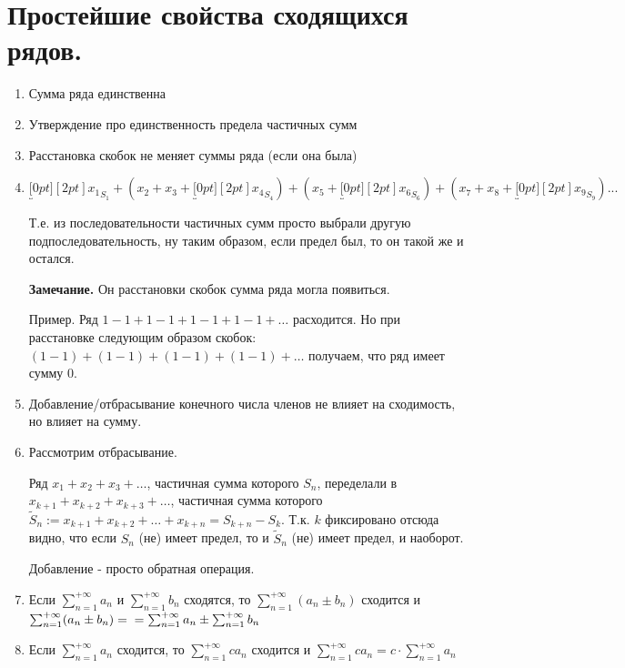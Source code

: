 \documentclass[12pt,letterpaper]{report}
\makeatletter
\theoremstyle{definition}
\renewenvironment{proof}[1][\proofname]{%
   \par\pushQED{\qed}\normalfont%
   \topsep6\p@\@plus6\p@\relax
   \trivlist\item[\hskip\labelsep\bfseries#1\@addpunct{.}]%
   \ignorespaces
}{%
   \popQED\endtrivlist\@endpefalse
}
\makeatother
\begin{document}
\section{Простейшие свойства сходящихся рядов.}

\begin{enumerate}
    \item Сумма ряда единственна
    
    \begin{proof}
        Утверждение про единственность предела частичных сумм
    \end{proof}

    \item Расстановка скобок не меняет суммы ряда (если она была)
    
    \begin{proof}
        $\underbracket[0pt][2pt]{x_1}_{S_1} + (x_2 + x_3 +
        \underbracket[0pt][2pt]{x_4}_{S_4}) + (x_5 + 
        \underbracket[0pt][2pt]{x_6}_{S_6}) + (x_7 + x_8 + 
        \underbracket[0pt][2pt]{x_9}_{S_9})...$

        Т.е. из последовательности частичных сумм просто выбрали
        другую подпоследовательность, ну таким образом, если предел был,
        то он такой же и остался.
    \end{proof}

    \textbf{Замечание.} Он расстановки скобок сумма ряда могла
    появиться.

    Пример. Ряд $1 - 1 + 1 - 1 + 1 - 1 + 1 - 1 + \dots$ расходится.
    Но при расстановке следующим образом скобок:
    $(1 - 1) + (1 - 1) + (1 - 1) + (1 - 1) + \dots$ получаем, что ряд
    имеет сумму $0$.

    \item Добавление/отбрасывание конечного числа членов не влияет на
    сходимость, но влияет на сумму.

    \begin{proof}
        Рассмотрим отбрасывание.

        Ряд $x_1 + x_2 + x_3 + \dots$, частичная сумма которого
        $S_n$, переделали в $x_{k+1} + x_{k+2} + x_{k+3} + \dots$,
        частичная сумма которого $\widetilde{S}_n := x_{k+1} + x_{k+2}
        + \dots + x_{k+n} = S_{k + n} - S_{k}$. Т.к. $k$ фиксировано
        отсюда видно, что если $S_n$ (не) имеет предел, то и
        $\widetilde{S}_n$ (не) имеет предел, и наоборот.

        Добавление - просто обратная операция.
    \end{proof}

    \item Если $\sum_{n = 1}^{+\infty} a_n$ и $\sum_{n = 1}^{+\infty} b_n$
    сходятся, то $\sum_{n = 1}^{+\infty} (a_n \pm b_n)$ сходится и
    $\sum_{n = 1}^{+\infty} (a_n \pm b_n) =\vspace*{0,2cm} \\ = \sum_{n = 1}^{+\infty} a_n
    \pm \sum_{n = 1}^{+\infty} b_n$

    \item Если $\sum_{n = 1}^{+\infty} a_n$ сходится, то
    $\sum_{n = 1}^{+\infty} c a_n$ сходится и $\sum_{n = 1}^{+\infty} 
    c a_n = c \cdot \sum_{n = 1}^{+\infty} a_n$ 
\end{enumerate}
\ifdefined\niveldos\else
\end{document}
